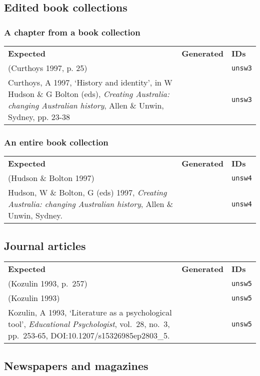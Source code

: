 \documentclass[a4paper,landscape,12pt]{article}
\newlength\q
\newlength\qr
\newenvironment{citetable}
  {\noindent\begin{longtable}{p{\q} p{\q} p{\qr}}\textbf{Expected} & \textbf{Generated} & \textbf{IDs}\\}
  {\end{longtable}}
\newcommand{\minorissue}[1]{\textcolor{blue}{#1}}
\begin{document}
\subsection{Edited book collections}

\subsubsection{A chapter from a book collection}

\begin{citetable}
	(Curthoys 1997, p. 25) & \parencite[p.~25]{unsw3} & \texttt{unsw3} \\
	Curthoys, A 1997, `History and identity', in W Hudson \& G Bolton (eds), \textit{Creating Australia: changing Australian history}, Allen \& Unwin, Sydney, pp. 23-38 & \fullcite{unsw3} & \texttt{unsw3} \\
\end{citetable}

\subsubsection{An entire book collection}

\begin{citetable}
	(Hudson \& Bolton 1997) & \parencite{unsw4} & \texttt{unsw4} \\
	Hudson, W \& Bolton, G (eds) 1997, \textit{Creating Australia: changing Australian history}, Allen \& Unwin, Sydney. & \fullcite{unsw4} & \texttt{unsw4} \\
\end{citetable}

\subsection{Journal articles}

\begin{citetable}
	(Kozulin 1993, p.~257) & \parencite[p.~257]{unsw5} & \texttt{unsw5} \\
	(Kozulin 1993) & \parencite{unsw5} & \texttt{unsw5} \\
	Kozulin, A 1993, `Literature as a psychological tool', \textit{Educational Psychologist}, vol.~28, no.~3, pp.~253-65, DOI:10.1207/s15326985ep2803\_5. & \minorissue{\fullcite{unsw5}} & \texttt{unsw5} \\
\end{citetable}

\subsection{Newspapers and magazines}
\end{document}
